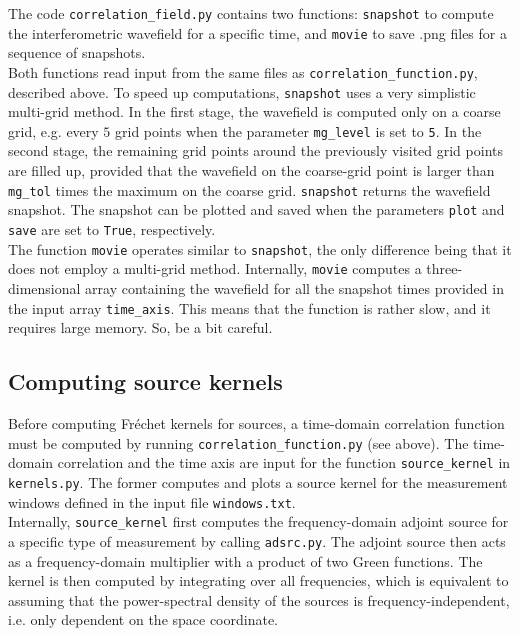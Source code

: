 The code \texttt{correlation\_field.py} contains two functions: \texttt{snapshot} to compute the interferometric wavefield for a specific time, and \texttt{movie} to save .png files for a sequence of snapshots.\\[5pt]
%
Both functions read input from the same files as \texttt{correlation\_function.py}, described above. To speed up computations, \texttt{snapshot} uses a very simplistic multi-grid method. In the first stage, the wavefield is computed only on a coarse grid, e.g. every $5$ grid points when the parameter \texttt{mg\_level} is set to \texttt{5}. In the second stage, the remaining grid points around the previously visited grid points are filled up, provided that the wavefield on the coarse-grid point is larger than \texttt{mg\_tol} times the maximum on the coarse grid. \texttt{snapshot} returns the wavefield snapshot. The snapshot can be plotted and saved when the parameters \texttt{plot} and \texttt{save} are set to \texttt{True}, respectively.\\[5pt]
%
The function \texttt{movie} operates similar to \texttt{snapshot}, the only difference being that it does not employ a multi-grid method. Internally, \texttt{movie} computes a three-dimensional array containing the wavefield for all the snapshot times provided in the input array \texttt{time\_axis}. This means that the function is rather slow, and it requires large memory. So, be a bit careful.

\subsection{Computing source kernels}

Before computing Fr\'{e}chet kernels for sources, a time-domain correlation function must be computed by running \texttt{correlation\_function.py} (see above). The time-domain correlation and the time axis are input for the function \texttt{source\_kernel} in \texttt{kernels.py}. The former computes and plots a source kernel for the measurement windows defined in the input file \texttt{windows.txt}.\\[5pt]
%
Internally, \texttt{source\_kernel} first computes the frequency-domain adjoint source for a specific type of measurement by calling \texttt{adsrc.py}. The adjoint source then acts as a frequency-domain multiplier with a product of two Green functions. The kernel is then computed by integrating over all frequencies, which is equivalent to assuming that the power-spectral density of the sources is frequency-independent, i.e. only dependent on the space coordinate.